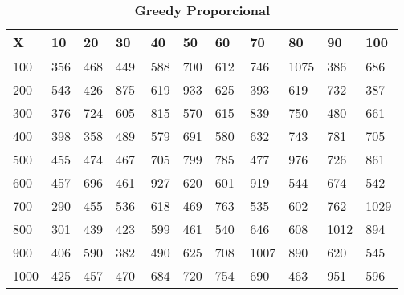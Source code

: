 \documentclass[10pt,letterpaper]{article}
\begin{document}
\begin{center}
\begin{table}\renewcommand{\arraystretch}{2.5}
\caption{\large \textbf{Greedy Proporcional}}
\centering
\begin{tabular} { |m{0.5cm}|m{1.3cm}|m{1.3cm}|m{1.3cm}|m{1.3cm}|m{1.3cm}|m{1.3cm}|m{1.3cm}|m{1.3cm}|m{1.3cm}|m{1.3cm}|} 
\hline
\rowcolor{Gray}
\centering \textbf{X} & \centering \textbf{10} & \centering \textbf{20} & \centering \textbf{30}\ & \centering \textbf{40} & \centering \textbf{50} & \centering \textbf{60}\ & \centering \textbf{70} & \centering \textbf{80} & \centering \textbf{90}\ & \textbf{100} \\\hline
\cellcolor{Gray}100 & \Large 356 & \Large 468 & \Large 449 & \Large 588 & \Large 700 & \Large 612 & \Large 746 & \Large 1075 & \Large 386 & \Large 686 \\
\hline
\cellcolor{Gray}200 & \Large 543 & \Large 426 & \Large 875 & \Large 619 & \Large 933 & \Large 625 & \Large 393 & \Large 619 & \Large 732 & \Large 387 \\
\hline
\cellcolor{Gray}300 & \Large 376 & \Large 724 & \Large 605 & \Large 815 & \Large 570 & \Large 615 & \Large 839 & \Large 750 & \Large 480 & \Large 661 \\
\hline
\cellcolor{Gray}400 & \Large 398 & \Large 358 & \Large 489 & \Large 579 & \Large 691 & \Large 580 & \Large 632 & \Large 743 & \Large 781 & \Large 705 \\
\hline
\cellcolor{Gray}500 & \Large 455 & \Large 474 & \Large 467 & \Large 705 & \Large 799 & \Large 785 & \Large 477 & \Large 976 & \Large 726 & \Large 861 \\
\hline
\cellcolor{Gray}600 & \Large 457 & \Large 696 & \Large 461 & \Large 927 & \Large 620 & \Large 601 & \Large 919 & \Large 544 & \Large 674 & \Large 542 \\
\hline
\cellcolor{Gray}700 & \Large 290 & \Large 455 & \Large 536 & \Large 618 & \Large 469 & \Large 763 & \Large 535 & \Large 602 & \Large 762 & \Large 1029 \\
\hline
\cellcolor{Gray}800 & \Large 301 & \Large 439 & \Large 423 & \Large 599 & \Large 461 & \Large 540 & \Large 646 & \Large 608 & \Large 1012 & \Large 894 \\
\hline
\cellcolor{Gray}900 & \Large 406 & \Large 590 & \Large 382 & \Large 490 & \Large 625 & \Large 708 & \Large 1007 & \Large 890 & \Large 620 & \Large 545 \\
\hline
\cellcolor{Gray}1000 & \Large 425 & \Large 457 & \Large 470 & \Large 684 & \Large 720 & \Large 754 & \Large 690 & \Large 463 & \Large 951 & \Large 596 \\
\hline
\end{tabular} \\
\end{table}
\end{center}
\end{document}

